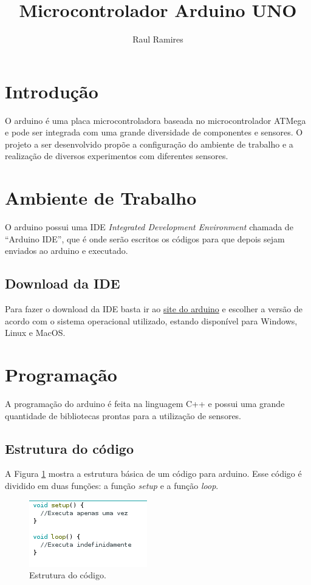 \documentclass[12pt]{article}
\title{\textbf{Microcontrolador Arduino UNO}}
\author{Raul Ramires\inst{1}}
\begin{document}
 

\maketitle

\section{Introdução}
	O arduino é uma placa microcontroladora baseada no microcontrolador ATMega e pode ser integrada com uma grande diversidade de componentes e sensores. O projeto a ser desenvolvido propõe a configuração do ambiente de trabalho e a realização de diversos experimentos com diferentes sensores.

\section{Ambiente de Trabalho}
	O arduino possui uma IDE \textit{Integrated Development Environment} chamada de ``Arduino IDE'', que é onde serão escritos os códigos para que depois sejam enviados ao arduino e executado.

\subsection{Download da IDE}
	Para fazer o download da IDE basta ir ao \href{https://www.arduino.cc/en/Main/Software}{site do arduino} e escolher a versão de acordo com o sistema operacional utilizado, estando disponível para Windows, Linux e MacOS.

\section{Programação}
	A programação do arduino é feita na linguagem C++ e possui uma grande quantidade de bibliotecas prontas para a utilização de sensores.

\subsection{Estrutura do código}
	A Figura \ref{figEstruturaCodigo} mostra a estrutura básica de um código para arduino. Esse código é dividido em duas funções: a função \textit{setup} e a função \textit{loop}.

	\begin{figure}[h!]
		\centering
		\includegraphics[scale=1.3]{Imagens/figEstrutura.png}
		\caption{Estrutura do código.}
		\label{figEstruturaCodigo}
	\end{figure}
\end{document}
